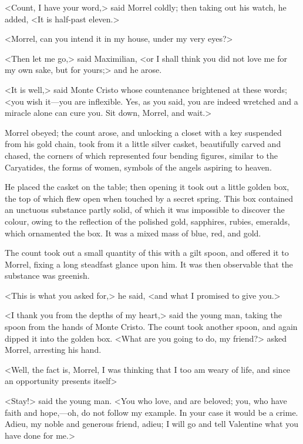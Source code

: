  <Count, I have your word,> said Morrel coldly; then taking out his watch, he added, <It is half-past eleven.> 

 <Morrel, can you intend it in my house, under my very eyes?> 

 <Then let me go,> said Maximilian, <or I shall think you did not love me for my own sake, but for yours;> and he arose. 

 <It is well,> said Monte Cristo whose countenance brightened at these words; <you wish it—you are inflexible. Yes, as you said, you are indeed wretched and a miracle alone can cure you. Sit down, Morrel, and wait.> 

 Morrel obeyed; the count arose, and unlocking a closet with a key suspended from his gold chain, took from it a little silver casket, beautifully carved and chased, the corners of which represented four bending figures, similar to the Caryatides, the forms of women, symbols of the angels aspiring to heaven. 

 He placed the casket on the table; then opening it took out a little golden box, the top of which flew open when touched by a secret spring. This box contained an unctuous substance partly solid, of which it was impossible to discover the colour, owing to the reflection of the polished gold, sapphires, rubies, emeralds, which ornamented the box. It was a mixed mass of blue, red, and gold. 

 The count took out a small quantity of this with a gilt spoon, and offered it to Morrel, fixing a long steadfast glance upon him. It was then observable that the substance was greenish. 

 <This is what you asked for,> he said, <and what I promised to give you.> 

 <I thank you from the depths of my heart,> said the young man, taking the spoon from the hands of Monte Cristo. The count took another spoon, and again dipped it into the golden box. <What are you going to do, my friend?> asked Morrel, arresting his hand. 

 <Well, the fact is, Morrel, I was thinking that I too am weary of life, and since an opportunity presents itself\longdash> 

 <Stay!> said the young man. <You who love, and are beloved; you, who have faith and hope,—oh, do not follow my example. In your case it would be a crime. Adieu, my noble and generous friend, adieu; I will go and tell Valentine what you have done for me.> 


